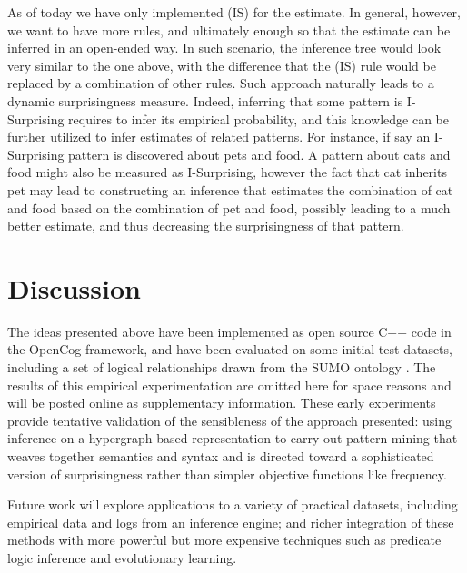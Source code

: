 \documentclass[runningheads]{llncs}
\begin{document}
As of today we have only implemented (IS) for the estimate. In
general, however, we want to have more rules, and ultimately enough so
that the estimate can be inferred in an open-ended way. In such
scenario, the inference tree would look very similar to the one above,
with the difference that the (IS) rule would be replaced by a
combination of other rules. Such approach naturally leads to a dynamic
surprisingness measure. Indeed, inferring that some pattern is
I-Surprising requires to infer its empirical probability, and this
knowledge can be further utilized to infer estimates of related
patterns. For instance, if say an I-Surprising pattern is discovered
about pets and food. A pattern about cats and food might also be
measured as I-Surprising, however the fact that cat inherits pet may
lead to constructing an inference that estimates the combination of
cat and food based on the combination of pet and food, possibly
leading to a much better estimate, and thus decreasing the
surprisingness of that pattern.

\section{Discussion}

The ideas presented above have been implemented as open source C++
code in the OpenCog framework, and have been evaluated on some initial
test datasets, including a set of logical relationships drawn from the
SUMO ontology \cite{Pease2011}.  The results of this empirical
experimentation are omitted here for space reasons and will be posted
online as supplementary information.  These early experiments provide
tentative validation of the sensibleness of the approach presented:
using inference on a hypergraph based representation to carry out
pattern mining that weaves together semantics and syntax and is
directed toward a sophisticated version of surprisingness rather than
simpler objective functions like frequency.

Future work will explore applications to a variety of practical
datasets, including empirical data and logs from an inference engine;
and richer integration of these methods with more powerful but more
expensive techniques such as predicate logic inference and
evolutionary learning.


\end{document}
